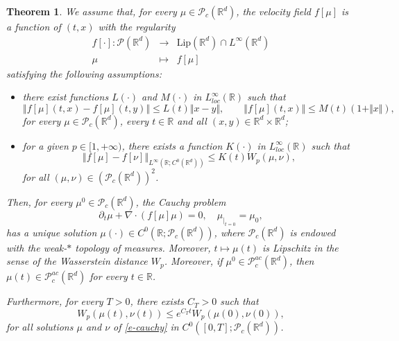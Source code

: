 \documentclass{article}
\newcommand{\R}{\mathbb{R}}
\newtheorem{theorem}{Theorem}
\theoremstyle{definition}\newtheorem{remark}{Remark}
\newcommand{\Lip}{\mathrm{Lip}}
\newcommand{\FR}[1]{\footnote{#1}}
\begin{document}
\begin{theorem}\label{t-esistenza}
We assume that, for every $\mu\in \mathcal{P}_c(\R^d)$, the velocity field $f[\mu]$ is a function of $(t,x)$ with the regularity
\begin{equation*}
\begin{array}{rcl}
f[\cdot]: \mathcal{P}(\R^d) & \longrightarrow & \Lip(\R^d)\cap L^\infty(\R^d) \\
\mu & \longmapsto & f[\mu] 
\end{array}
\end{equation*}
satisfying the following assumptions:
\begin{itemize}
\item %
there exist functions $L(\cdot)$ and $M(\cdot)$ in $L^\infty_{loc}(\R)$ such that 
$$
\left\Vert f[\mu](t,x)-f[\mu](t,y) \right\Vert \leq L(t) \Vert x-y\Vert,\qquad \Vert f[\mu](t,x)\Vert \leq M(t) (1+\Vert x\Vert ),
$$
for every $\mu\in\mathcal{P}_c(\R^d)$, every $t\in\R$ and all $(x,y)\in\R^d\times\R^d$;
\item for a given $p\in[1,+\infty)$, there exists a function $K(\cdot)$ in $L^\infty_{loc}(\R)$ such that  
$$
\left\Vert f[\mu]-f[\nu] \right\Vert _{L^\infty(\R;C^0(\R^d))} \leq K(t) W_p(\mu,\nu),
$$
for all $(\mu,\nu)\in(\mathcal{P}_c(\R^d))^2$.
\end{itemize}
Then, for every $\mu^0\in\mathcal{P}_c(\R^d)$, the Cauchy problem
\begin{equation}\label{e-cauchy}
\partial_t\mu+\nabla\cdot(f[\mu] \mu)=0, \quad \mu_{|_{t=0}}=\mu_0,
\end{equation}
has a unique solution $\mu(\cdot)\in C^0(\R;\mathcal{P}_c(\R^d))$, where $\mathcal{P}_c(\R^d)$ is endowed with the weak-$*$ topology of measures. 
Moreover, $t\mapsto \mu(t)$ is Lipschitz in the sense of the Wasserstein distance $W_p$. 
Moreover, if $\mu^0\in\mathcal{P}^{ac}_c(\R^d)$, then $\mu(t)\in\mathcal{P}^{ac}_c(\R^d)$ for every $t\in\R$.

Furthermore, for every $T>0$, there exists $C_T>0$ such that 
\begin{equation}\label{e-stabilitypde}
W_p(\mu(t),\nu(t))\leq e^{C_T t}W_p(\mu(0),\nu(0)),
\end{equation}
for all solutions $\mu$ and $\nu$ of \eqref{e-cauchy} in $C^0([0,T];\mathcal{P}_c(\R^d))$. %


\end{theorem}
\end{document}
